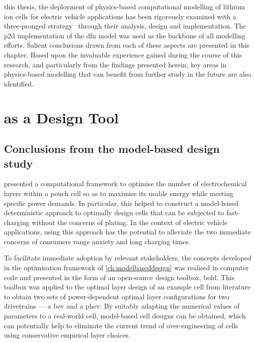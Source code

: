 \bigskip

 this  thesis, the  deployment of  physics-based computational
modelling  of lithium  ion  cells  for electric  vehicle  applications has  been
rigorously examined  with a three-pronged strategy  \viz~through their analysis,
design and implementation.  The \gls{p2d} implementation of  the \gls{dfn} model
was  used  as  the  backbone  of  all  modelling  efforts.  Salient  conclusions
drawn  from each  of these  aspects are  presented in  this chapter.  Based upon
the  invaluable  experience gained  during  the  course  of this  research,  and
particularly  from the  findings presented  herein, key  areas in  physics-based
modelling that can benefit from further study in the future are also identified.

\section{ as a Design Tool}

\subsection{Conclusions from the model-based design study}\label{sec:modelbasedconclusion}

 presented  a computational framework to  optimise the
number  of electrochemical  layers within  a pouch  cell so  as to  maximise its
usable energy while  meeting specific power demands. In  particular, this helped
to construct a model-based deterministic approach to optimally design cells that
can  be subjected  to  fast-charging without  the concerns  of  plating. In  the
context of electric vehicle applications,  using this approach has the potential
to alleviate  the two immediate concerns  of consumers \viz{} range  anxiety and
long charging times.

To  facilitate  immediate  adoption   by  relevant  stakeholders,  the  concepts
developed  in  the  optimisation  framework  of  \cref{ch:modelbaseddesign}  was
realised in  computer code and  presented in the  form of an  open-source design
toolbox, \gls{bold}. This toolbox was applied  to the optimal layer design of an
example cell from literature to obtain two sets of power-dependent optimal layer
configurations for two drivetrains --- a \gls{bev} and a \gls{phev}. By suitably
adapting the  numerical values of  parameters to a real-world  cell, model-based
cell  designs can  be  obtained, which  can potentially  help  to eliminate  the
current trend  of over-engineering of  cells using conservative  empirical layer
choices.

